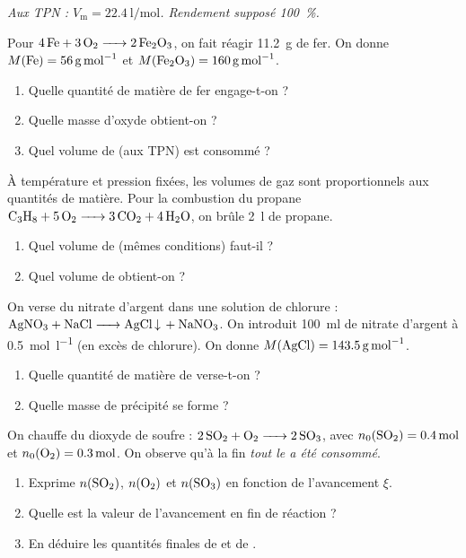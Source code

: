 \documentclass[11pt,a4paper]{article}
\begin{document}
\begin{center}\small\itshape
Aux TPN : $V_{\mathrm{m}}=\qty{22.4}{\litre\per\mole}$. Rendement supposé \qty{100}{\percent}.
\end{center}

\begin{exo}
Pour $\ce{4 Fe + 3 O2 -> 2 Fe2O3}$, on fait réagir \qty{11.2}{\gram} de fer.
On donne $M(\ce{Fe})=\qty{56}{\gram\per\mole}$ et $M(\ce{Fe2O3})=\qty{160}{\gram\per\mole}$.
\begin{enumerate}[label=\alph*)]
  \item Quelle quantité de matière de fer engage-t-on ?
  \item Quelle masse d'oxyde  obtient-on ?
  \item Quel volume de  (aux TPN) est consommé ?
\end{enumerate}
\end{exo}

\begin{exo}
À température et pression fixées, les volumes de gaz sont proportionnels aux quantités de matière.
Pour la combustion du propane $\ce{C3H8 + 5 O2 -> 3 CO2 + 4 H2O}$, on brûle \qty{2}{\litre} de propane.
\begin{enumerate}[label=\alph*)]
  \item Quel volume de  (mêmes conditions) faut-il ?
  \item Quel volume de  obtient-on ?
\end{enumerate}
\end{exo}

\begin{exo}
On verse du nitrate d'argent dans une solution de chlorure : $\ce{AgNO3 + NaCl -> AgCl v + NaNO3}$.
On introduit \qty{100}{\milli\litre} de nitrate d'argent à \qty{0.5}{\mole\per\litre} (en excès de chlorure).
On donne $M(\ce{AgCl})=\qty{143.5}{\gram\per\mole}$.
\begin{enumerate}[label=\alph*)]
  \item Quelle quantité de matière de  verse-t-on ?
  \item Quelle masse de précipité  se forme ?
\end{enumerate}
\end{exo}

\begin{exo}
On chauffe du dioxyde de soufre : $\ce{2 SO2 + O2 -> 2 SO3}$, avec $n_0(\ce{SO2})=\qty{0.4}{\mole}$ et
$n_0(\ce{O2})=\qty{0.3}{\mole}$. On observe qu'à la fin \emph{tout le  a été consommé}.
\begin{enumerate}[label=\alph*)]
  \item Exprime $n(\ce{SO2})$, $n(\ce{O2})$ et $n(\ce{SO3})$ en fonction de l'avancement $\xi$.
  \item Quelle est la valeur de l'avancement en fin de réaction ?
  \item En déduire les quantités finales de  et de .
\end{enumerate}
\end{exo}
\end{document}
